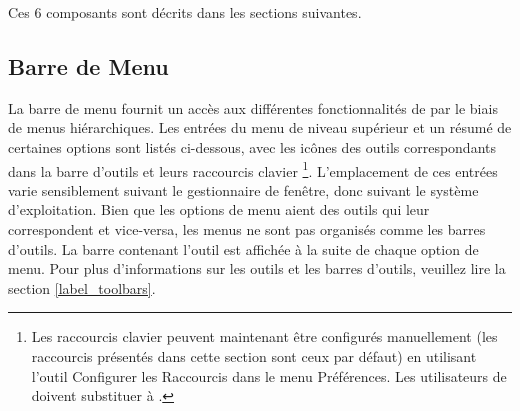 Ces 6 composants sont décrits dans les sections suivantes.

\subsection{Barre de Menu} \label{label_menubar}

La barre de menu fournit un accès aux différentes fonctionnalités de \qg par le biais de menus hiérarchiques. Les entrées du menu de niveau supérieur et un résumé de certaines options sont listés ci-dessous, avec les icônes des outils correspondants dans la barre d'outils et leurs raccourcis clavier \footnote{Les raccourcis clavier peuvent maintenant être configurés manuellement (les raccourcis présentés dans cette section sont ceux par défaut) en utilisant l'outil Configurer les Raccourcis dans le menu Préférences. Les utilisateurs de \osx{} doivent substituer  à .}. L'emplacement de ces entrées varie sensiblement suivant le gestionnaire de fenêtre, donc suivant le système d'exploitation. Bien que les options de menu aient des outils qui leur correspondent et vice-versa, les menus ne sont pas organisés comme les barres d'outils. La barre contenant l'outil est affichée à la suite de chaque option de menu. Pour plus d'informations sur les outils et les barres d'outils, veuillez lire la section \ref{label_toolbars}.

